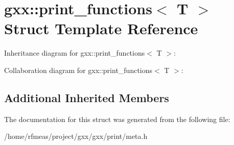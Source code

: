 \hypertarget{structgxx_1_1print__functions}{}\section{gxx\+:\+:print\+\_\+functions$<$ T $>$ Struct Template Reference}
\label{structgxx_1_1print__functions}


Inheritance diagram for gxx\+:\+:print\+\_\+functions$<$ T $>$\+:


Collaboration diagram for gxx\+:\+:print\+\_\+functions$<$ T $>$\+:
\subsection*{Additional Inherited Members}


The documentation for this struct was generated from the following file\+:\begin{DoxyCompactItemize}
\item 
/home/rfmeas/project/gxx/gxx/print/meta.\+h\end{DoxyCompactItemize}
